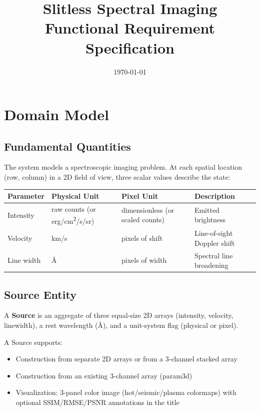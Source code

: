 \documentclass[11pt,a4paper]{article}
\title{Slitless Spectral Imaging \\ Functional Requirement Specification}
\author{}
\date{\today}
\begin{document}
\maketitle

\tableofcontents
\newpage

\section{Domain Model}

\subsection{Fundamental Quantities}
The system models a spectroscopic imaging problem. At each spatial location (row, column) in a 2D field of view, three scalar values describe the state:

\begin{table}[H]
\centering
\begin{tabular}{llll}
\toprule
\textbf{Parameter} & \textbf{Physical Unit} & \textbf{Pixel Unit} & \textbf{Description} \\
\midrule
Intensity & raw counts (or erg/cm\textsuperscript{2}/s/sr) & dimensionless (or scaled counts) & Emitted brightness \\
Velocity  & km/s           & pixels of shift  & Line-of-sight Doppler shift \\
Line width & \AA{}        & pixels of width  & Spectral line broadening \\
\bottomrule
\end{tabular}
\end{table}

\subsection{Source Entity}
A \textbf{Source} is an aggregate of three equal-size 2D arrays (intensity, velocity, linewidth), a rest wavelength (\AA), and a unit-system flag (physical or pixel).

A Source supports:
\begin{itemize}[nosep]
  \item Construction from separate 2D arrays or from a 3-channel stacked array
  \item Construction from an existing 3-channel array (param3d)
  \item Visualization: 3-panel color image (hot/seismic/plasma colormaps) with optional SSIM/RMSE/PSNR annotations in the title
\end{itemize}
\end{document}
